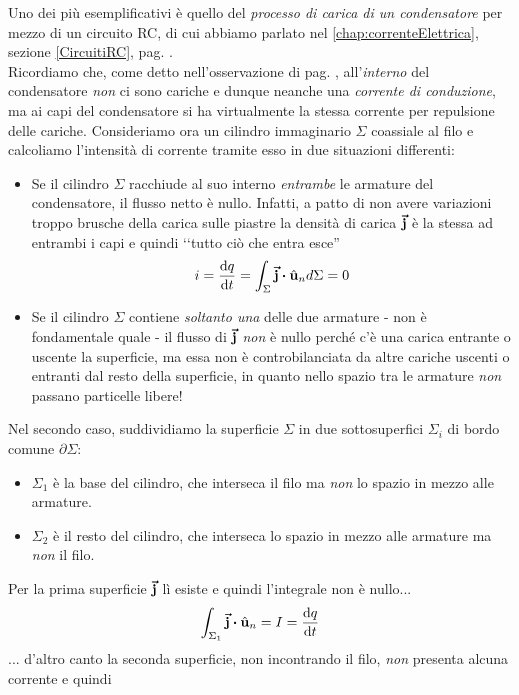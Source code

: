 Uno dei più esemplificativi è quello del \textit{processo di carica di un condensatore} per mezzo di un circuito RC, di cui abbiamo parlato nel \autoref{chap:correnteElettrica}, sezione \ref{CircuitiRC}, pag. \pageref{CircuitiRC}.\\
Ricordiamo che, come detto nell'osservazione di pag. \pageref{correntevariabile}, all'\textit{interno} del condensatore \textit{non} ci sono cariche e dunque neanche una \textit{corrente di conduzione}, ma ai capi del condensatore si ha virtualmente la stessa corrente per repulsione delle cariche. Consideriamo ora un cilindro immaginario $\Sigma$ coassiale al filo e calcoliamo l'intensità di corrente tramite esso in due situazioni differenti: 
\begin{itemize}
	\item Se il cilindro $\Sigma$ racchiude al suo interno \textit{entrambe} le armature del condensatore, il flusso netto è nullo. Infatti, a patto di non avere variazioni troppo brusche della carica sulle piastre la densità di carica $\vb*{\va{j}}$ è la stessa ad entrambi i capi e quindi ‘‘tutto ciò che entra esce''
	\begin{equation*}
		i=\dv{q}{t}=\int_{\Sigma}\vba{j}\vdot\vbh{u}_nd\Sigma=0
	\end{equation*} 
	\item Se il cilindro $\Sigma$ contiene \textit{soltanto una} delle due armature - non è fondamentale quale - il flusso di $\vb*{\va{j}}$ \textit{non} è nullo perché c'è una carica entrante o uscente la superficie, ma essa non è controbilanciata da altre cariche uscenti o entranti dal resto della superficie, in quanto nello spazio tra le armature \textit{non} passano particelle libere!
\end{itemize}
Nel secondo caso, suddividiamo la superficie $\Sigma$ in due sottosuperfici $\Sigma_i$ di bordo comune $\partial \Sigma$:
\begin{itemize}
	\item $\Sigma_1$ è la base del cilindro, che interseca il filo ma \textit{non} lo spazio in mezzo alle armature.
	\item $\Sigma_2$ è il resto del cilindro, che interseca lo spazio in mezzo alle armature ma \textit{non} il filo.
\end{itemize}
Per la prima superficie $\vb*{\va{j}}$ lì esiste e quindi l'integrale non è nullo...
\begin{equation*}
	\int_{\Sigma_1}\vba{j}\vdot\vbh{u}_n=I=\dv{q}{t}
\end{equation*}
... d'altro canto la seconda superficie, non incontrando il filo, \textit{non} presenta alcuna corrente e quindi
